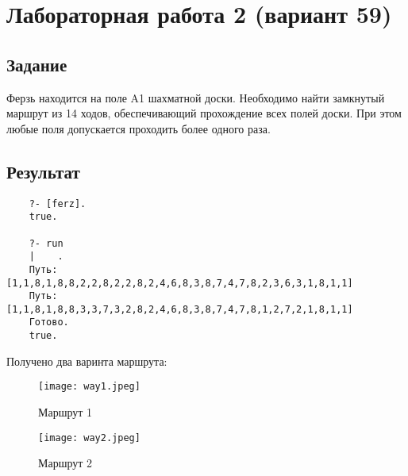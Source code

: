 \newpage
\section{Лабораторная работа 2 (вариант 59)}
\subsection{Задание}


Ферзь находится на поле A1 шахматной доски. Необходимо найти замкнутый маршрут из 14 ходов, обеспечивающий прохождение всех полей доски. При этом любые поля допускается проходить более одного раза.

\subsection{Результат}
\begin{verbatim}
    ?- [ferz].
    true.

    ?- run
    |    .
    Путь: [1,1,8,1,8,8,2,2,8,2,2,8,2,4,6,8,3,8,7,4,7,8,2,3,6,3,1,8,1,1]
    Путь: [1,1,8,1,8,8,3,3,7,3,2,8,2,4,6,8,3,8,7,4,7,8,1,2,7,2,1,8,1,1]
    Готово.
    true.
\end{verbatim}

Получено два варинта маршрута:

\begin{figure}[H]
\centering
\texttt{[image: way1.jpeg]}
\caption{Маршрут 1}
\texttt{[image: way2.jpeg]}
\caption{Маршрут 2}
\label{img:ways}
\end{figure}

